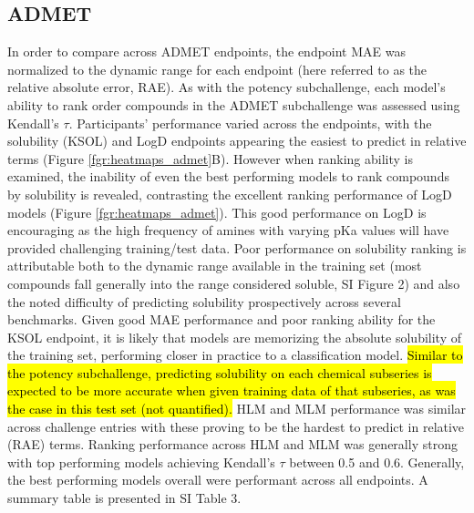 \documentclass[journal=jcim,manuscript=article]{achemso}
\begin{document}
\subsection{ADMET}
In order to compare across ADMET endpoints, the endpoint MAE was normalized to the dynamic range for each endpoint (here referred to as the relative absolute error, RAE). As with the potency subchallenge, each model's ability to rank order compounds in the ADMET subchallenge was assessed using Kendall's $\tau$. Participants' performance varied across the endpoints, with the solubility (KSOL) and LogD endpoints appearing the easiest to predict in relative terms (Figure \ref{fgr:heatmaps_admet}B). However when ranking ability is examined, the inability of even the best performing models to rank compounds by solubility is revealed, contrasting the excellent ranking performance of LogD models (Figure \ref{fgr:heatmaps_admet}). This good performance on LogD is encouraging as the high frequency of amines with varying pKa values will have provided challenging training/test data. Poor performance on solubility ranking is attributable both to the dynamic range available in the training set (most compounds fall generally into the range considered soluble, SI Figure 2) and also the noted difficulty of predicting solubility prospectively across several benchmarks\cite{llompart_minoletti_baybekov_horvath_marcou_varnek_2024}. Given good MAE performance and poor ranking ability for the KSOL endpoint, it is likely that models are memorizing the absolute solubility of the training set, performing closer in practice to a classification model. \hl{Similar to the potency subchallenge, predicting solubility on each chemical subseries is expected to be more accurate when given training data of that subseries, as was the case in this test set (not quantified).} HLM and MLM performance was similar across challenge entries with these proving to be the hardest to predict in relative (RAE) terms. Ranking performance across HLM and MLM was generally strong with top performing models achieving Kendall's $\tau$ between 0.5 and 0.6. Generally, the best performing models overall were performant across all endpoints. A summary table is presented in SI Table 3.
\end{document}
